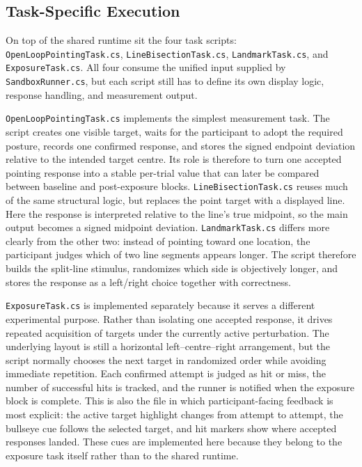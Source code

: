 \subsection{Task-Specific Execution}
\label{subsec:implementation-tasks}

On top of the shared runtime sit the four task scripts: \texttt{OpenLoopPointingTask.cs}, \texttt{LineBisectionTask.cs}, \texttt{LandmarkTask.cs}, and \texttt{ExposureTask.cs}. All four consume the unified input supplied by \texttt{SandboxRunner.cs}, but each script still has to define its own display logic, response handling, and measurement output.

\texttt{OpenLoopPointingTask.cs} implements the simplest measurement task. The script creates one visible target, waits for the participant to adopt the required posture, records one confirmed response, and stores the signed endpoint deviation relative to the intended target centre. Its role is therefore to turn one accepted pointing response into a stable per-trial value that can later be compared between baseline and post-exposure blocks. \texttt{LineBisectionTask.cs} reuses much of the same structural logic, but replaces the point target with a displayed line. Here the response is interpreted relative to the line's true midpoint, so the main output becomes a signed midpoint deviation. \texttt{LandmarkTask.cs} differs more clearly from the other two: instead of pointing toward one location, the participant judges which of two line segments appears longer. The script therefore builds the split-line stimulus, randomizes which side is objectively longer, and stores the response as a left/right choice together with correctness.

\texttt{ExposureTask.cs} is implemented separately because it serves a different experimental purpose. Rather than isolating one accepted response, it drives repeated acquisition of targets under the currently active perturbation. The underlying layout is still a horizontal left--centre--right arrangement, but the script normally chooses the next target in randomized order while avoiding immediate repetition. Each confirmed attempt is judged as hit or miss, the number of successful hits is tracked, and the runner is notified when the exposure block is complete. This is also the file in which participant-facing feedback is most explicit: the active target highlight changes from attempt to attempt, the bullseye cue follows the selected target, and hit markers show where accepted responses landed. These cues are implemented here because they belong to the exposure task itself rather than to the shared runtime.

